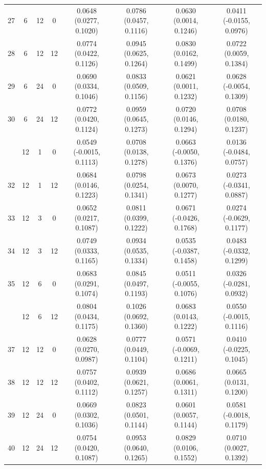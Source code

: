 \begin{table}[!h]
{\begin{tabular}[t]{cccccccc}
27 & 6 & 12 & 0 & 0.0648 (0.0277, 0.1020) & 0.0786 (0.0457, 0.1116) & 0.0630 (0.0014, 0.1246) & 0.0411 (-0.0155, 0.0976)\\
28 & 6 & 12 & 12 & 0.0774 (0.0422, 0.1126) & 0.0945 (0.0625, 0.1264) & 0.0830 (0.0162, 0.1499) & 0.0722 (0.0059, 0.1384)\\
29 & 6 & 24 & 0 & 0.0690 (0.0334, 0.1046) & 0.0833 (0.0509, 0.1156) & 0.0621 (0.0011, 0.1232) & 0.0628 (-0.0054, 0.1309)\\
30 & 6 & 24 & 12 & 0.0772 (0.0420, 0.1124) & 0.0959 (0.0645, 0.1273) & 0.0720 (0.0146, 0.1294) & 0.0708 (0.0180, 0.1237)\\
\addlinespace
31 & 12 & 1 & 0 & 0.0549 (-0.0015, 0.1113) & 0.0708 (0.0138, 0.1278) & 0.0663 (-0.0050, 0.1376) & 0.0136 (-0.0484, 0.0757)\\
32 & 12 & 1 & 12 & 0.0684 (0.0146, 0.1223) & 0.0798 (0.0254, 0.1341) & 0.0673 (0.0070, 0.1277) & 0.0273 (-0.0341, 0.0887)\\
33 & 12 & 3 & 0 & 0.0652 (0.0217, 0.1087) & 0.0811 (0.0399, 0.1222) & 0.0671 (-0.0426, 0.1768) & 0.0274 (-0.0629, 0.1177)\\
34 & 12 & 3 & 12 & 0.0749 (0.0333, 0.1165) & 0.0934 (0.0535, 0.1334) & 0.0535 (-0.0387, 0.1458) & 0.0483 (-0.0332, 0.1299)\\
35 & 12 & 6 & 0 & 0.0683 (0.0291, 0.1074) & 0.0845 (0.0497, 0.1193) & 0.0511 (-0.0055, 0.1076) & 0.0326 (-0.0281, 0.0932)\\
\addlinespace
36 & 12 & 6 & 12 & 0.0804 (0.0434, 0.1175) & 0.1026 (0.0692, 0.1360) & 0.0683 (0.0143, 0.1222) & 0.0550 (-0.0015, 0.1116)\\
37 & 12 & 12 & 0 & 0.0628 (0.0270, 0.0987) & 0.0777 (0.0449, 0.1104) & 0.0571 (-0.0069, 0.1211) & 0.0410 (-0.0225, 0.1045)\\
38 & 12 & 12 & 12 & 0.0757 (0.0402, 0.1112) & 0.0939 (0.0621, 0.1257) & 0.0686 (0.0061, 0.1311) & 0.0665 (0.0131, 0.1200)\\
39 & 12 & 24 & 0 & 0.0669 (0.0302, 0.1036) & 0.0823 (0.0501, 0.1144) & 0.0601 (0.0057, 0.1144) & 0.0581 (-0.0018, 0.1179)\\
40 & 12 & 24 & 12 & 0.0754 (0.0420, 0.1087) & 0.0953 (0.0640, 0.1265) & 0.0829 (0.0106, 0.1552) & 0.0710 (0.0027, 0.1392)\\
\bottomrule
\end{tabular}}
\end{table}
